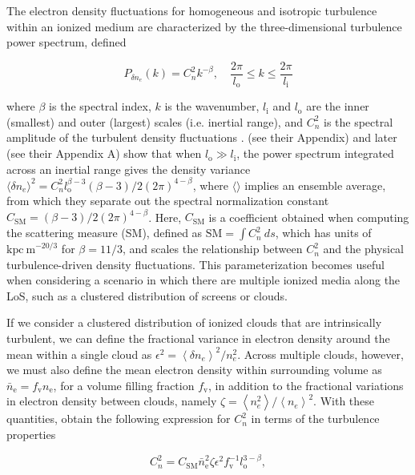 \documentclass[twocolumn, linenumbers, tra]{aastex631}
\begin{document}
{The electron density fluctuations for homogeneous and isotropic turbulence within an ionized medium are characterized by the three-dimensional turbulence power spectrum, defined

\begin{equation}\label{eq:powspec}
P_{\delta n_e}(k)=C_n^2 k^{-\beta}, \quad \frac{2 \pi}{l_\mathrm{o}} \leqslant k \leqslant \frac{2 \pi}{l_\mathrm{i}}
\end{equation}

\noindent
where $\beta$ is the spectral index, $k$ is the wavenumber, $l_\mathrm{i}$ and $l_\mathrm{o}$ are the inner (smallest) and outer (largest) scales (i.e. inertial range), and $C_n^2$ is the spectral amplitude of the turbulent density fluctuations \citep{Cordes1991}. \citet{Cordes2022} (see their Appendix) and later \citet{Ocker2025} (see their Appendix A) show that when $l_\mathrm{o} \gg l_\mathrm{i}$, the power spectrum integrated across an inertial range gives the density variance $\langle \delta n_e \rangle^2 = C_n^2 l_{\mathrm{o}}^{\beta-3} (\beta-3) / 2(2 \pi)^{4-\beta}$, where $\langle \rangle$ implies an ensemble average, from which they separate out the spectral normalization constant $C_{\mathrm{SM}}=(\beta-3) / 2(2 \pi)^{4-\beta}$. Here, $C_{\mathrm{SM}}$ is a coefficient obtained when computing the scattering measure (SM), defined as $\mathrm{SM}=\int C_n^2\ ds$, which has units of $\mathrm{kpc\ m}^{-20/3}$ for $\beta = 11/3$, and scales the relationship between $C_n^2$ and the physical turbulence-driven density fluctuations. This parameterization becomes useful when considering a scenario in which there are multiple ionized media along the LoS, such as a clustered distribution of screens or clouds. 

If we consider a clustered distribution of ionized clouds that are intrinsically turbulent, we can define the fractional variance in electron density around the mean within a single cloud as $\epsilon^2=\left\langle\delta n_{e}\right\rangle^2 / n_{e}^2$. Across multiple clouds, however, we must also define the mean electron density within surrounding volume as $\bar{n}_{\mathrm{e}}=f_{\mathrm{v}} n_{\mathrm{e}}$, for a volume filling fraction $f_{\mathrm{v}}$, in addition to the fractional variations in electron density between clouds, namely $\zeta=\left\langle n_{e}^2\right\rangle /\left\langle n_{e}\right\rangle^2$. With these quantities, \citet{Cordes2022} obtain the following expression for $C_n^2$ in terms of the turbulence properties

\begin{equation}\label{eq:cn2}
C_n^2=C_{\mathrm{SM}} \bar{n}_{\mathrm{e}}^2 \zeta \epsilon^2 f_{\mathrm{v}}^{-1} l_\mathrm{o}^{3-\beta},
\end{equation}

}
\end{document}

